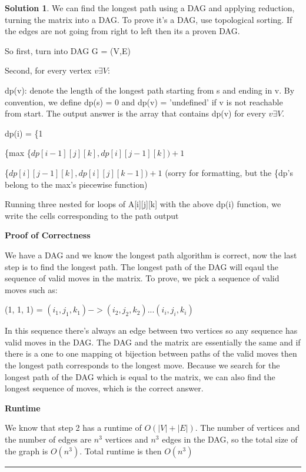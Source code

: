 \documentclass{article}
\theoremstyle{definition}
\def\fline{\rule{0.75\linewidth}{0.5pt}}
\newcommand{\finishline}{\begin{center}\fline\end{center}}
\newtheorem*{solution*}{Solution}
\newenvironment{solution}{\begin{solution*}}{{\finishline} \end{solution*}}
\begin{document}
\begin{solution}
	\item We can find the longest path using a DAG and applying reduction, turning the matrix into a DAG. To prove it's a DAG, use topological sorting. If the edges are not going from right to left then its a proven DAG.
	\item So first, turn into DAG G = (V,E)
	\item Second, for every vertex $v \exists V$:
	\item dp(v): denote the length of the longest path starting from s and ending in v. By convention, we define dp(s) = 0 and dp(v) = 'undefined' if v is not reachable from start. The output answer is the array that contains dp(v) for every  $v \exists V$.
	\item dp(i) = \{1
			\item \{max  \{$dp[i-1][j][k], dp[i][j-1][k]) +1$
			\item  \{$dp[i][j-1][k], dp[i][j][k-1]) +1$   (sorry for formatting, but the \{dp's belong to the max's piecewise function)
	\item Running three nested for loops of A[i][j][k] with the above dp(i) function, we write the cells corresponding to the path output

	\item \textbf{Proof of Correctness}
	\item We have a DAG and we know the longest path algorithm is correct, now the last step is to find the longest path. The longest path of the DAG will eqaul the sequence of valid moves in the matrix. To prove, we pick a sequence of valid moves such as:
	\item (1, 1, 1) = $(i_1, j_1, k_1) -> (i_2, j_2, k_2) ... (i_i, j_i, k_i)$
	\item In this sequence there's always an edge between two vertices so any sequence has valid moves in the DAG. The DAG and the matrix are essentially the same and if there is a one to one mapping ot bijection between paths of the valid moves then the longest path corresponds to the longest move. Because we search for the longest path of the DAG which is equal to the matrix, we can also find the longest sequence of moves, which is the correct answer.

	\item \textbf{Runtime}
	\item We know that step  2 has a runtime of $O(|V| + |E|)$. The number of vertices and the number of edges are $n^3$ vertices and $n^3$ edges in the DAG, so the total size of the graph is $O(n^3)$. Total runtime is then $O(n^3)$
	
\end{solution}
\end{document}
